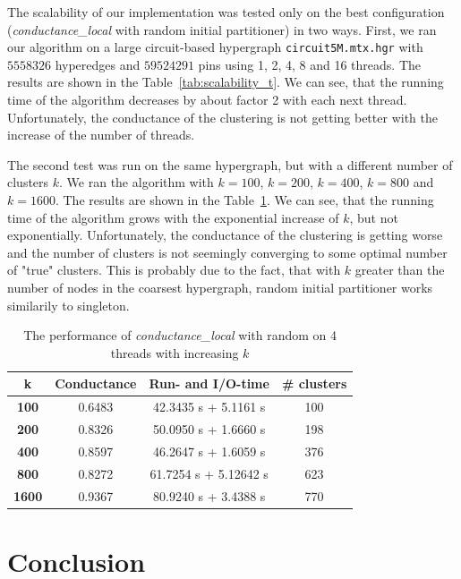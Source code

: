 \documentclass[acmsmall,nonacm,screen,review]{acmart}
\begin{document}
The scalability of our implementation was tested only on the best configuration
(\textit{conductance\_local} with random initial partitioner) in two ways. First, 
we ran our algorithm on a large circuit-based hypergraph \texttt{circuit5M.mtx.hgr} 
with $5 558 326$ hyperedges and $59 524 291$ pins using 1, 2, 4, 8 and 16 threads.
The results are shown in the Table~\ref{tab:scalability_t}. We can see, that the 
running time of the algorithm decreases by about factor 2 with each next thread.
Unfortunately, the conductance of the clustering is not getting better with
the increase of the number of threads.

\smallskip
\noindent The second test was run on the same hypergraph, but with a different
number of clusters $k$. We ran the algorithm with $k = 100$, $k = 200$, $k = 400$, 
$k = 800$ and $k = 1600$. The results are shown in the Table~\ref{tab:scalability_k}. 
We can see, that the running time of the algorithm grows with the exponential increase 
of $k$, but not exponentially. Unfortunately, the conductance of the clustering is
getting worse and the number of clusters is not seemingly converging to some 
optimal number of "true" clusters. This is probably due to the fact, that with $k$
greater than the number of nodes in the coarsest hypergraph, random initial partitioner 
works similarily to singleton.

\begin{table}
    \centering
    \begin{tabular}{|c|c|c|c|} \hline
        \textbf{k} & \textbf{Conductance} & \textbf{Run- and I/O-time} & \textbf{\# clusters} \\ \hline
        \textbf{100} & 0.6483 & 42.3435 s + 5.1161 s & 100 \\ 
        \textbf{200} & 0.8326 & 50.0950 s + 1.6660 s & 198 \\ 
        \textbf{400} & 0.8597 & 46.2647 s + 1.6059 s & 376 \\ 
        \textbf{800} & 0.8272 & 61.7254 s + 5.12642 s & 623 \\ 
        \textbf{1600} & 0.9367 & 80.9240 s + 3.4388 s & 770 \\ \hline
    \end{tabular}
    \caption{The performance of \textit{conductance\_local} with random on 4 threads
    with increasing $k$}
    \label{tab:scalability_k}
\end{table}

\section{Conclusion}
\label{sec:conclusion}
\end{document}
